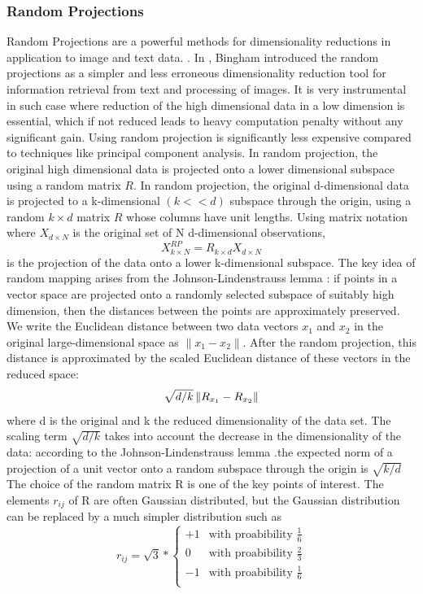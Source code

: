 \subsubsection{Random Projections}
Random Projections are a powerful methods for dimensionality reductions in application to image and text data. \cite{randproj}.  In \cite{rpCite}, Bingham introduced the random projections as a simpler and less erroneous dimensionality reduction tool for information retrieval from text and processing of images.  It is very instrumental in such case where reduction of the high dimensional data in a low dimension is essential, which if not reduced leads to heavy computation penalty without any significant gain. 
   Using random projection is significantly less expensive compared to techniques like principal component analysis. In random projection, the original high dimensional data is projected onto a lower dimensional subspace using a random matrix $R$. 
	In random projection, the original d-dimensional data is projected to a k-dimensional $(k << d)$ subspace through the origin, using a random $k \times d$ matrix $R$ whose columns have unit lengths. Using matrix notation where $X_{d\times N} $ is the original set of N d-dimensional observations,
$$ X^{RP}_{k\times N} = R_{k\times d} X_{d\times N} $$
is the projection of the data onto a lower k-dimensional subspace. The key idea of random mapping arises from the Johnson-Lindenstrauss lemma \cite{lemma}: if points in a vector space are projected onto a randomly selected subspace of suitably high dimension, then the distances between the points are approximately preserved.   
We write the Euclidean distance between two data vectors $x_1$ and $x_2$ in the original large-dimensional space as $\lVert x_1 - x_2 \rVert$. After the random projection, this distance is approximated by the scaled Euclidean distance of these vectors in the reduced space:
$$\sqrt{ d/k} \left\lVert R_{x_1} - R_{x_2} \right\rVert$$
where d is the original and k the reduced dimensionality of the data set. The scaling term $\sqrt{d/k}$ takes into account the decrease in the dimensionality of the data: according to the Johnson-Lindenstrauss lemma \cite{lemma}.the expected norm of a projection of a unit vector onto a random subspace through the origin is $\sqrt{k/d}$
 The choice of the random matrix R is one of the key points of interest. The elements $r_{ij}$ of R are often Gaussian distributed,
but the Gaussian distribution can be replaced by a much simpler distribution such as
\[
	r_{ij} = \sqrt{3}*\begin{cases} 
	 +1 & \textrm{with proabibility $\frac{1}{6}$} \\
	 0 & \textrm{with proabibility $\frac{2}{3}$}\\
	-1 & \textrm{with proabibility $\frac{1}{6}$} \\
		\end{cases}
\]
